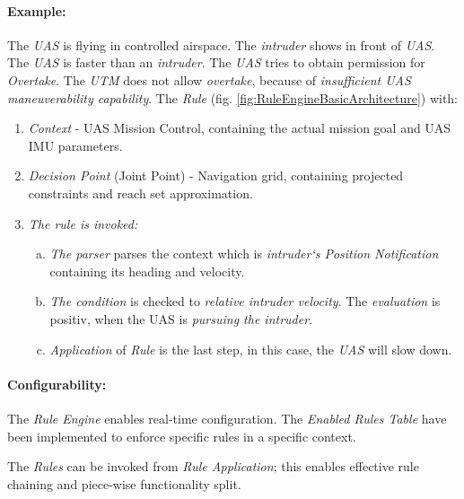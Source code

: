 \paragraph{Example:} The \emph{UAS} is flying in controlled airspace.  The \emph{intruder} shows in front of \emph{UAS}. The \emph{UAS} is faster than an \emph{intruder}. The \emph{UAS} tries to obtain permission for \emph{Overtake}. The \emph{UTM} does not allow \emph{overtake}, because of \emph{insufficient UAS maneuverability capability}. The \emph{Rule} (fig. \ref{fig:RuleEngineBasicArchitecture}) with:
\begin{enumerate}
    \item \emph{Context} - UAS Mission Control, containing the actual mission goal and UAS IMU parameters. 
    
    \item \emph{Decision Point} (Joint Point) - Navigation grid, containing projected constraints and reach set approximation.
    
    \item \emph{The rule is invoked:}
    \begin{enumerate}[a.]
        \item \emph{The parser} parses the context which is \emph{intruder`s Position Notification} containing its heading and velocity.
        
        \item \emph{The condition} is checked to \emph{relative intruder velocity}. The \emph{evaluation} is positiv, when the UAS is \emph{pursuing the intruder}.
        
        \item \emph{Application} of \emph{Rule} is the last step, in this case, the \emph{UAS} will slow down.
    \end{enumerate}
\end{enumerate}

\paragraph{Configurability:} The \emph{Rule Engine} enables real-time configuration. The \emph{Enabled Rules Table} have been implemented to enforce specific rules in a specific context. 

The \emph{Rules} can be invoked from \emph{Rule Application}; this enables effective rule chaining and piece-wise functionality split. 

